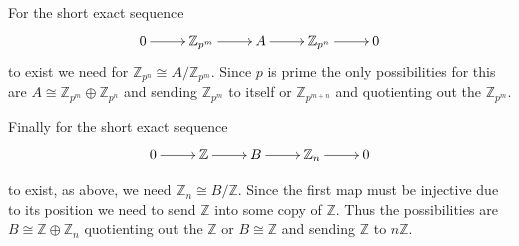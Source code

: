 \documentclass[10pt]{article}
\newcommand{\sk}{\vskip 10mm}
\newcommand{\bb}[1]{\mathbb{#1}}
\theoremstyle{plain}
\theoremstyle{remark}
\begin{document}
For the short exact sequence
\[
  \xymatrix{0 \ar[r] & \bb{Z}_{p^m} \ar[r] & A \ar[r] & \bb{Z}_{p^n}\ar[r] & 0}
\]
to exist we need for $\bb{Z}_{p^n}\cong A/\bb{Z}_{p^m}$. Since $p$ is prime the
only possibilities for this are $A\cong \bb{Z}_{p^m}\oplus\bb{Z}_{p^n}$ and sending
$\bb{Z}_{p^m}$ to itself or $\bb{Z}_{p^{m+n}}$ and quotienting out the $\bb{Z}_{p^m}$.


Finally for the short exact sequence
\[
  \xymatrix{0 \ar[r] & \bb{Z} \ar[r] & B \ar[r] & \bb{Z}_n\ar[r] & 0}
\]

to exist, as above, we need $\bb{Z}_n\cong B/\bb{Z}$. Since the first map
must be injective due to its position we need to send $\bb{Z}$ into
some copy of $\bb{Z}$. Thus the possibilities are $B\cong \bb{Z}\oplus\bb{Z}_n$
quotienting out the $\bb{Z}$ or $B\cong\bb{Z}$ and sending $\bb{Z}$ to $n\bb{Z}$.

\sk

\end{document}
